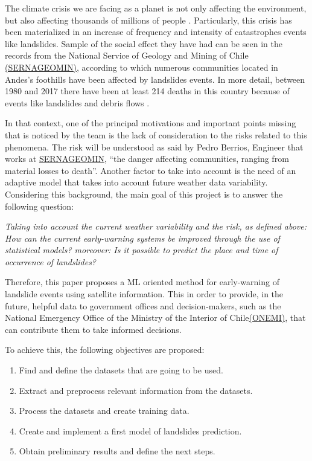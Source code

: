 \documentclass[sigconf, nonacm]{acmart}
\begin{document}
The climate crisis we are facing as a planet is not only affecting the environment, but also affecting thousands of millions of people \cite{landslidesandclimatechange}. Particularly, this crisis has been materialized in an increase of frequency and intensity of catastrophes events like landslides. Sample of the social effect they have had can be seen in the records from the National Service of Geology and Mining of Chile \href{https://www.sernageomin.cl/}{(SERNAGEOMIN)}, according to which numerous communities located in Andes's foothills have been affected by landslides events. In more detail, between 1980 and 2017 there have been at least 214 deaths in this country because of events like landslides and debris flows \cite{sernageomin}. 

In that context, one of the principal motivations and important points missing that is noticed by the team is the lack of consideration to the risks related to this phenomena. The risk will be understood as said by Pedro Berrios, Engineer that works at \href{https://www.sernageomin.cl/}{SERNAGEOMIN}, ``the danger affecting communities, ranging from material losses to death''. Another factor to take into account is the need of an adaptive model that takes into account future weather data variability. Considering this background, the main goal of this project is to answer the following question:


\textit{Taking into account the current weather variability and the risk, as defined above: How can the current early-warning systems be improved through
the use of statistical models? moreover: Is it possible to predict the place and time of occurrence of landslides?}

Therefore, this paper proposes a ML oriented method for early-warning of landslide events using satellite information. This in order to provide, in the future, helpful data to government offices and decision-makers, such as the National Emergency Office of the Ministry of the Interior of Chile\href{https://www.onemi.gov.cl/}{(ONEMI)}, that can contribute them to take informed decisions.

To achieve this, the following objectives are proposed:
\begin{enumerate}
    \item Find and define the datasets that are going to be used.
    \item Extract and preprocess relevant information from the datasets.
    \item Process the datasets and create training data.
    \item Create and implement a first model of landslides prediction.
    \item Obtain preliminary results and define the next steps.
\end{enumerate}
\end{document}
